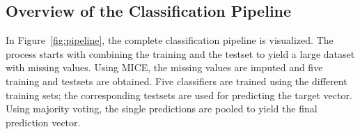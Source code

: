 \subsection{Overview of the Classification Pipeline}

In Figure~\ref{fig:pipeline}, the complete classification pipeline is visualized. The process starts with combining the training and the testset to yield a large dataset with missing values. Using MICE, the missing values are imputed and five training and testsets are obtained. Five classifiers are trained using the different training sets; the corresponding testsets are used for predicting the target vector. Using majority voting, the single predictions are pooled to yield the final prediction vector.